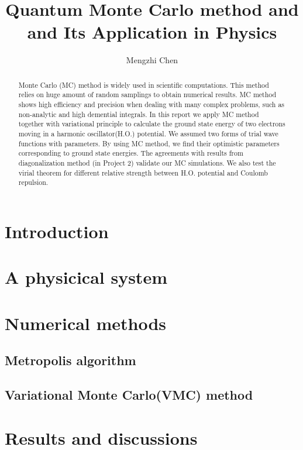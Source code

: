 \documentclass{article}
\title{Quantum Monte Carlo method and and Its Application in Physics}
\author{Mengzhi Chen}
\affil{Department of Physics and Astronomy, Michigan State University}
\date{}
\begin{document}
	\maketitle
	\begin{abstract}\label{abstract}
Monte Carlo (MC) method is widely used in scientific computations.
This method relies on huge amount of random samplings to obtain numerical results.
MC method shows high efficiency and precision when dealing with many complex problems, such as non-analytic and high demential integrals. 
In this report we apply MC method together with variational principle to calculate the ground state energy of two electrons moving in a harmonic oscillator(H.O.) potential.
We assumed two forms of trial wave functions with parameters. 
By using MC method, we find their optimistic parameters corresponding to ground state energies.
The agreements with results from diagonalization method (in Project 2) validate our MC simulations.
We also test the virial theorem for different relative strength between H.O. potential and Coulomb repulsion.

	\end{abstract}

\section{Introduction}\label{intro} 


\section{A physicical system}\label{phys}

	
	
\section{Numerical methods}\label{method}
	\subsection{Metropolis algorithm}\label{metro}
	

	
	\subsection{Variational Monte Carlo(VMC) method} \label{vmc}
	


	
\section{Results and discussions}\label{results}
\end{document}
